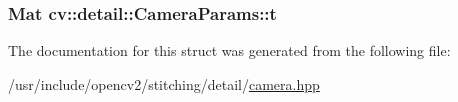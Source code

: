 \hypertarget{structcv_1_1detail_1_1CameraParams_a03f6f66c0a56bed0831ebffcf9481f6c}{
\subsubsection[{t}]{\setlength{\rightskip}{0pt plus 5cm}Mat cv\-::detail\-::\-Camera\-Params\-::t}}\label{structcv_1_1detail_1_1CameraParams_a03f6f66c0a56bed0831ebffcf9481f6c}


The documentation for this struct was generated from the following file\-:\begin{DoxyCompactItemize}
\item 
/usr/include/opencv2/stitching/detail/\hyperlink{camera_8hpp}{camera.\-hpp}\end{DoxyCompactItemize}
